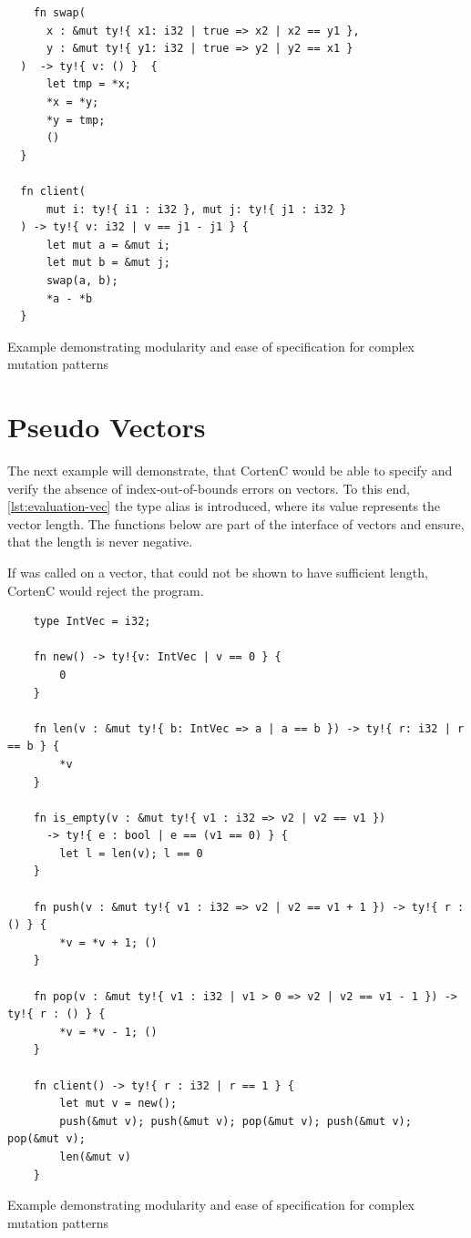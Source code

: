 \documentclass[twoside, english]{sdqthesis}
\theoremstyle{definition}
\begin{document}
\begin{listing}[ht]
  \begin{verbatim}
    fn swap(
      x : &mut ty!{ x1: i32 | true => x2 | x2 == y1 },
      y : &mut ty!{ y1: i32 | true => y2 | y2 == x1 }
  )  -> ty!{ v: () }  {
      let tmp = *x;
      *x = *y;
      *y = tmp;
      ()
  }

  fn client(
      mut i: ty!{ i1 : i32 }, mut j: ty!{ j1 : i32 }
  ) -> ty!{ v: i32 | v == j1 - j1 } {
      let mut a = &mut i;
      let mut b = &mut j;
      swap(a, b);
      *a - *b
  }
  \end{verbatim}
  \caption{Example demonstrating modularity and ease of specification for complex mutation patterns}
  \label{lst:evaluation-swap}
\end{listing}

\section{Pseudo Vectors}

The next example will demonstrate, that CortenC would be able to specify and verify the absence of index-out-of-bounds errors on vectors. To this end, \cref{lst:evaluation-vec} the type alias  is introduced, where its value represents the vector length.
The functions below are part of the interface of vectors and ensure, that the length is never negative.

If  was called on a vector, that could not be shown to have sufficient length, CortenC would reject the program.

\begin{listing}[ht]
  \begin{verbatim}
    type IntVec = i32;

    fn new() -> ty!{v: IntVec | v == 0 } {
        0
    }

    fn len(v : &mut ty!{ b: IntVec => a | a == b }) -> ty!{ r: i32 | r == b } {
        *v
    }

    fn is_empty(v : &mut ty!{ v1 : i32 => v2 | v2 == v1 }) 
      -> ty!{ e : bool | e == (v1 == 0) } {
        let l = len(v); l == 0
    }

    fn push(v : &mut ty!{ v1 : i32 => v2 | v2 == v1 + 1 }) -> ty!{ r : () } {
        *v = *v + 1; ()
    }

    fn pop(v : &mut ty!{ v1 : i32 | v1 > 0 => v2 | v2 == v1 - 1 }) -> ty!{ r : () } {
        *v = *v - 1; ()
    }

    fn client() -> ty!{ r : i32 | r == 1 } {
        let mut v = new();
        push(&mut v); push(&mut v); pop(&mut v); push(&mut v); pop(&mut v);
        len(&mut v)
    }
  \end{verbatim}
  \caption{Example demonstrating modularity and ease of specification for complex mutation patterns}
  \label{lst:evaluation-vec}
\end{listing}
\end{document}
